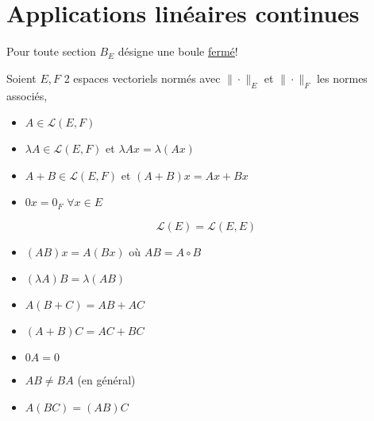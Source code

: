 \section{Applications linéaires continues}
Pour toute section $B_E$ désigne une boule \underline{fermé}!
\par
Soient $E, F$ 2 espaces vectoriels normés avec  $\| \cdot \|_{E}$ et $\| \cdot \|_{F}$ les normes associés, 
\begin{itemize}
    \item $A \in \mathcal{L}(E, F)$
    \item $\lambda A \in \mathcal{L}(E, F)$ et $\lambda Ax = \lambda(Ax)$
    \item  $A + B \in \mathcal{L}(E, F)$ et $(A + B)x = Ax + Bx$
    \item  $0x = 0_F$  $\forall x \in E$
\end{itemize}
\[
    \mathcal{L}(E) = \mathcal{L}(E, E)
\] 
\begin{itemize}
    \item $(AB)x = A(Bx)$ où  $AB = A \circ B$
    \item  $(\lambda A)B = \lambda (AB)$
    \item  $A(B + C) = AB + AC$
    \item  $(A + B)C = AC + BC$
    \item  $0A = 0$ 
    \item $AB \neq BA$ (en général)
    \item $A(BC) = (AB)C$
\end{itemize}


